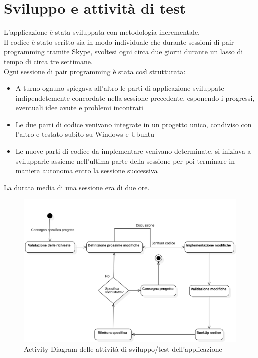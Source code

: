 \documentclass[12pt]{article}
\begin{document}
\section{Sviluppo e attività di test}
L'applicazione è stata sviluppata con metodologia incrementale.
\\
Il codice è stato scritto sia in modo individuale che durante sessioni di pair-programming tramite Skype, svoltesi  ogni circa due giorni durante un lasso di tempo di circa tre settimane.
\\
Ogni sessione di pair programming è stata così strutturata:

\begin{itemize}
\item A turno ognuno spiegava all'altro le parti di applicazione sviluppate indipendetemente concordate nella sessione precedente, esponendo i progressi, eventuali idee avute e problemi incontrati
\item Le due parti di codice venivano integrate in un progetto unico, condiviso con l'altro e testato subito su Windows e Ubuntu
\item Le nuove parti di codice da implementare venivano determinate, si iniziava a svilupparle assieme nell'ultima parte della sessione per poi terminare in maniera autonoma entro la sessione successiva
\end{itemize}

La durata media di una sessione era di due ore.


\begin{figure}[h!]
	\begin{center}
 	 	\includegraphics[width=\textwidth,height=\textheight,keepaspectratio]{media/diagrams/activity/developement.png}
  	 	 \caption{Activity Diagram delle attività di sviluppo/test dell'applicazione}
	\end{center}
\end{figure}
\end{document}

